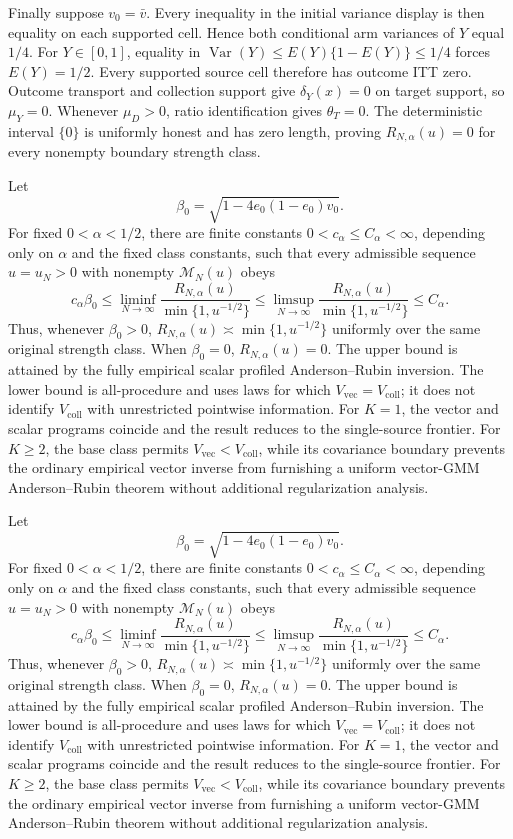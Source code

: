 Finally suppose \(v_0=\bar v\). Every inequality in the initial variance display is then equality on each supported cell. Hence both conditional arm variances of \(Y\) equal \(1/4\). For \(Y\in[0,1]\), equality in
\(\operatorname{Var}(Y)\le E(Y)\{1-E(Y)\}\le1/4\) forces \(E(Y)=1/2\). Every supported source cell therefore has outcome ITT zero. Outcome transport and collection support give \(\delta_Y(x)=0\) on target support, so \(\mu_Y=0\). Whenever \(\mu_D>0\), ratio identification gives \(\theta_T=0\). The deterministic interval \(\{0\}\) is uniformly honest and has zero length, proving \(R_{N,\alpha}(u)=0\) for every nonempty boundary strength class.

Let
\[
\beta_0=\sqrt{1-4e_0(1-e_0)v_0}.
\]
For fixed \(0<\alpha<1/2\), there are finite constants \(0<c_\alpha\le C_\alpha<\infty\), depending only on \(\alpha\) and the fixed class constants, such that every admissible sequence \(u=u_N>0\) with nonempty \(\mathcal M_N(u)\) obeys
\[
c_\alpha\beta_0
\le\liminf_{N\to\infty}
\frac{R_{N,\alpha}(u)}{\min\{1,u^{-1/2}\}}
\le\limsup_{N\to\infty}
\frac{R_{N,\alpha}(u)}{\min\{1,u^{-1/2}\}}
\le C_\alpha.
\]
Thus, whenever \(\beta_0>0\), \(R_{N,\alpha}(u)\asymp\min\{1,u^{-1/2}\}\) uniformly over the same original strength class. When \(\beta_0=0\), \(R_{N,\alpha}(u)=0\). The upper bound is attained by the fully empirical scalar profiled Anderson--Rubin inversion. The lower bound is all-procedure and uses laws for which \(V_{\mathrm{vec}}=V_{\mathrm{coll}}\); it does not identify \(V_{\mathrm{coll}}\) with unrestricted pointwise information. For \(K=1\), the vector and scalar programs coincide and the result reduces to the single-source frontier. For \(K\ge2\), the base class permits \(V_{\mathrm{vec}}<V_{\mathrm{coll}}\), while its covariance boundary prevents the ordinary empirical vector inverse from furnishing a uniform vector-GMM Anderson--Rubin theorem without additional regularization analysis.

Let
\[
\beta_0=\sqrt{1-4e_0(1-e_0)v_0}.
\]
For fixed \(0<\alpha<1/2\), there are finite constants \(0<c_\alpha\le C_\alpha<\infty\), depending only on \(\alpha\) and the fixed class constants, such that every admissible sequence \(u=u_N>0\) with nonempty \(\mathcal M_N(u)\) obeys
\[
c_\alpha\beta_0
\le\liminf_{N\to\infty}
\frac{R_{N,\alpha}(u)}{\min\{1,u^{-1/2}\}}
\le\limsup_{N\to\infty}
\frac{R_{N,\alpha}(u)}{\min\{1,u^{-1/2}\}}
\le C_\alpha.
\]
Thus, whenever \(\beta_0>0\), \(R_{N,\alpha}(u)\asymp\min\{1,u^{-1/2}\}\) uniformly over the same original strength class. When \(\beta_0=0\), \(R_{N,\alpha}(u)=0\). The upper bound is attained by the fully empirical scalar profiled Anderson--Rubin inversion. The lower bound is all-procedure and uses laws for which \(V_{\mathrm{vec}}=V_{\mathrm{coll}}\); it does not identify \(V_{\mathrm{coll}}\) with unrestricted pointwise information. For \(K=1\), the vector and scalar programs coincide and the result reduces to the single-source frontier. For \(K\ge2\), the base class permits \(V_{\mathrm{vec}}<V_{\mathrm{coll}}\), while its covariance boundary prevents the ordinary empirical vector inverse from furnishing a uniform vector-GMM Anderson--Rubin theorem without additional regularization analysis.

